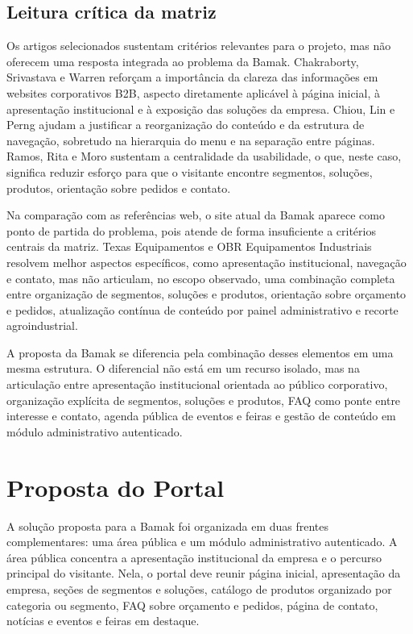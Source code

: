 \documentclass[portuguese]{sbcreviews-2025}
\begin{document}
\vspace{0.25em}

\subsection{Leitura crítica da matriz}

Os artigos selecionados sustentam critérios relevantes para o projeto, mas não oferecem uma resposta integrada ao problema da Bamak. Chakraborty, Srivastava e Warren \cite{chakraborty2005} reforçam a importância da clareza das informações em websites corporativos B2B, aspecto diretamente aplicável à página inicial, à apresentação institucional e à exposição das soluções da empresa. Chiou, Lin e Perng \cite{chiou2010} ajudam a justificar a reorganização do conteúdo e da estrutura de navegação, sobretudo na hierarquia do menu e na separação entre páginas. Ramos, Rita e Moro \cite{ramos2019} sustentam a centralidade da usabilidade, o que, neste caso, significa reduzir esforço para que o visitante encontre segmentos, soluções, produtos, orientação sobre pedidos e contato.

Na comparação com as referências web, o site atual da Bamak \cite{bamaksite} aparece como ponto de partida do problema, pois atende de forma insuficiente a critérios centrais da matriz. Texas Equipamentos \cite{texassite} e OBR Equipamentos Industriais \cite{obrsite} resolvem melhor aspectos específicos, como apresentação institucional, navegação e contato, mas não articulam, no escopo observado, uma combinação completa entre organização de segmentos, soluções e produtos, orientação sobre orçamento e pedidos, atualização contínua de conteúdo por painel administrativo e recorte agroindustrial.

A proposta da Bamak se diferencia pela combinação desses elementos em uma mesma estrutura. O diferencial não está em um recurso isolado, mas na articulação entre apresentação institucional orientada ao público corporativo, organização explícita de segmentos, soluções e produtos, FAQ como ponte entre interesse e contato, agenda pública de eventos e feiras e gestão de conteúdo em módulo administrativo autenticado.

\section{Proposta do Portal}

A solução proposta para a Bamak foi organizada em duas frentes complementares: uma área pública e um módulo administrativo autenticado. A área pública concentra a apresentação institucional da empresa e o percurso principal do visitante. Nela, o portal deve reunir página inicial, apresentação da empresa, seções de segmentos e soluções, catálogo de produtos organizado por categoria ou segmento, FAQ sobre orçamento e pedidos, página de contato, notícias e eventos e feiras em destaque.
\end{document}
